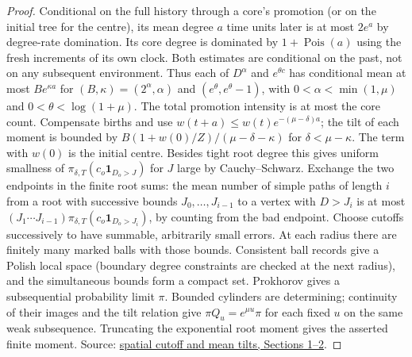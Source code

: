 \documentclass[11pt]{article}
\newcommand{\proofsrc}[2]{\href{https://github.com/uzay-eth/friend-tree-exponent/blob/a0972085ad72ad5685ae7b424988648d1965e73c/#1}{#2}}
\newcommand{\sectag}[1]{\renewcommand{\thesection}{#1}\renewcommand{\theHsection}{#1}}
\theoremstyle{remark}
\numberwithin{equation}{section}
\begin{document}
\begin{proof}
Conditional on the full history through a core's promotion (or on the initial tree for the centre), its mean degree $a$ time units later is at most $2e^a$ by degree-rate domination. Its core degree is dominated by $1+\operatorname{Pois}(a)$ using the fresh increments of its own clock. Both estimates are conditional on the past, not on any subsequent environment. Thus each of $D^\alpha$ and $e^{\theta c}$ has conditional mean at most $B e^{\kappa a}$ for $(B,\kappa)=(2^\alpha,\alpha)$ and $(e^\theta,e^\theta-1)$, with $0<\alpha<\min(1,\mu)$ and $0<\theta<\log(1+\mu)$. The total promotion intensity is at most the core count. Compensate births and use $w(t+a)\le w(t)e^{-(\mu-\delta)a}$; the tilt of each moment is bounded by $B(1+w(0)/Z)/(\mu-\delta-\kappa)$ for $\delta<\mu-\kappa$. The term with $w(0)$ is the initial centre. Besides tight root degree this gives uniform smallness of $\pi_{\delta,T}(c_o\mathbf1_{D_o>J})$ for $J$ large by Cauchy--Schwarz. Exchange the two endpoints in the finite root sums: the mean number of simple paths of length $i$ from a root with successive bounds $J_0,\ldots,J_{i-1}$ to a vertex with $D>J_i$ is at most $(J_1\cdots J_{i-1})\pi_{\delta,T}(c_o\mathbf1_{D_o>J_i})$, by counting from the bad endpoint. Choose cutoffs successively to have summable, arbitrarily small errors. At each radius there are finitely many marked balls with those bounds. Consistent ball records give a Polish local space (boundary degree constraints are checked at the next radius), and the simultaneous bounds form a compact set. Prokhorov gives a subsequential probability limit $\pi$. Bounded cylinders are determining; continuity of their images and the tilt relation give $\pi Q_u=e^{\mu u}\pi$ for each fixed $u$ on the same weak subsequence. Truncating the exponential root moment gives the asserted finite moment. Source: \proofsrc{round2/proofs/astra/source/round2/operator.md}{spatial cutoff and mean tilts, Sections 1--2}.
\end{proof}

\sectag{DEN}
\end{document}
